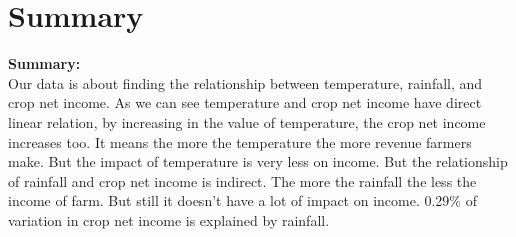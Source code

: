 \documentclass[12pt, a4paper]{article}
\begin{document}
\section{Summary}
\textbf{Summary: }\\
Our data is about finding the relationship between temperature, rainfall, and crop net income. As we can see temperature and crop net income have direct linear relation, by increasing in the value of temperature, the crop net income increases too. It means the more the temperature the more revenue farmers make. But the impact of temperature is very less on income. But the relationship of rainfall and crop net income is indirect. The more the rainfall the less the income of farm. But still it doesn't have a lot of impact on income. 0.29\% of variation in crop net income is explained by rainfall.  
\end{document}
